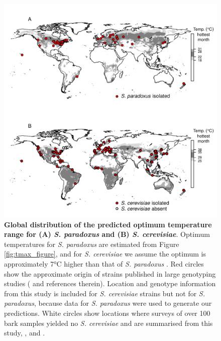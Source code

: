 \documentclass[12pt]{article}
\begin{document}
\begin{figure}[h!] \centering 
\includegraphics[width=1.0\textwidth]{../figs_tables/Figure4World.pdf} 
\caption{{\bf Global distribution of the predicted optimum temperature range for (A) \textit{S. paradoxus} and (B) \textit{S. cerevisiae}}. Optimum temperatures for \textit{S. paradoxus} are estimated from Figure \ref{fig:tmax_figure}, and for \textit{S. cerevisiae} we assume the optimum is approximately 7\si{\degreeCelsius} higher than that of \textit{S. paradoxus} \citep{sweeney_sympatric_2004}. Red circles show the approximate origin of strains published in large genotyping studies (\citet{liti_population_2009, zhang_saccharomyces_2010,kuehne_allopatric_2007,leducq_local_2014,naumov_differentiation_1997,cromie_genomic_2013,wang_surprisingly_2012,almeida_population_2015} and references therein). Location and genotype \citep{almeida_population_2015} information from this study is included for \textit{S. cerevisiae} strains but not for \textit{S. paradoxus}, because data for \textit{S. paradoxus} were used to generate our predictions. White circles show locations where surveys of over 100 bark samples yielded no \textit{S. cerevisiae} and are summarised from this study, \citet{charron_exploring_2014}, \citet{johnson_population_2004} and \citet{kowallik_interaction_2015}.}
\label{fig:worldmap_figure} 
\end{figure}
\clearpage
\end{document}
